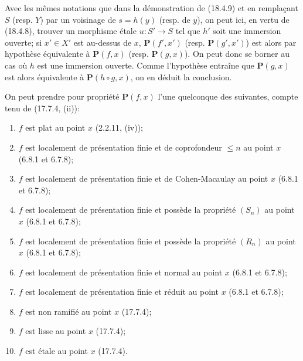 Avec les mêmes notations que dans la démonstration de (18.4.9) et en remplaçant $S$ (resp. $Y$) par un voisinage de $s=h(y)$ (resp. de $y$), on peut ici, en vertu de (18.4.8), trouver un morphisme étale $u:S'\to S$ tel que $h'$ soit une immersion ouverte; si $x'\in X'$ est au-dessus de $x$, $\boldsymbol{P}(f',x')$ (resp. $\boldsymbol{P}(g',x')$) est alors par hypothèse équivalente à $\boldsymbol{P}(f,x)$ (resp. $\boldsymbol{P}(g,x)$). On peut donc se borner au cas où $h$ est une immersion ouverte. Comme l'hypothèse entraîne que $\boldsymbol{P}(g,x)$ est alors équivalente à $\boldsymbol{P}(h\circ g,x)$, on en déduit la conclusion.

\begin{examples}[18.4.11]
\label{IV.18.4.11}
On peut prendre pour propriété $\boldsymbol{P}(f,x)$ l'une quelconque des suivantes, compte tenu de (17.7.4, (ii)):
\begin{enumerate}
  \item[(i)] $f$ est plat au point $x$ (2.2.11, (iv));
  \item[(ii)] $f$ est localement de présentation finie et de coprofondeur $\leq n$ au point $x$ (6.8.1 et 6.7.8);
  \item[(iii)] $f$ est localement de présentation finie et de Cohen-Macaulay au point $x$ (6.8.1 et 6.7.8);
  \item[(iv)] $f$ est localement de présentation finie et possède la propriété $(S_n)$ au point $x$ (6.8.1 et 6.7.8);
  \item[(v)] $f$ est localement de présentation finie et possède la propriété $(R_n)$ au point $x$ (6.8.1 et 6.7.8);
  \item[(vi)] $f$ est localement de présentation finie et normal au point $x$ (6.8.1 et 6.7.8);
  \item[(vii)] $f$ est localement de présentation finie et réduit au point $x$ (6.8.1 et 6.7.8);
  \item[(viii)] $f$ est non ramifié au point $x$ (17.7.4);
  \item[(ix)] $f$ est lisse au point $x$ (17.7.4);
  \item[(x)] $f$ est étale au point $x$ (17.7.4).
\end{enumerate}
\end{examples}


